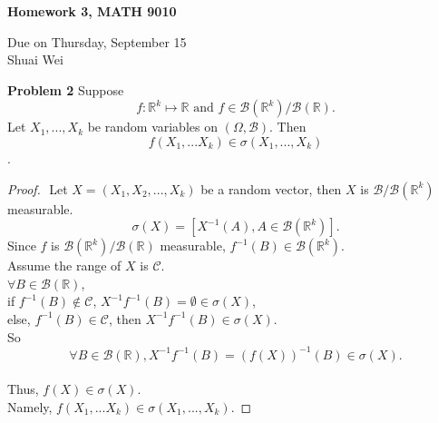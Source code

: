 \documentclass{article}
\newcommand{\llc}{\mathcal{C}}
\newcommand{\llb}{\mathcal{B}}
\newcommand{\bbr}{\mathbb{R}}
\begin{document}
\begin{center}

\textbf{Homework 3, MATH 9010}

Due on Thursday, September 15\\

Shuai Wei

\end{center}

\vspace{3 mm}

\noindent \textbf{Problem 2} Suppose\\
$$f : \bbr^k \mapsto \bbr \text{ and } f \in \llb (\bbr^k)/\llb(\bbr).$$
Let $X_1, ...,X_k $ be random variables on $(\Omega, \llb)$. Then\\

$$f(X_1,...X_k) \in \sigma(X_1,...,X_k)$$
.
\begin{proof}
	$ $ \newline
	Let $X = (X_1,X_2,...,X_k)$ be a random vector, then $X$ is $\llb/\llb(\bbr^k)$ measurable.\\
	$$\sigma(X) = [X^{-1}(A), A \in \llb(\bbr^k)].$$
	Since $f$ is $\llb(\bbr^k)/\llb(\bbr)$ measurable, $f^{-1}(B) \in \llb(\bbr^k)$.\\ 
	Assume the range of $X$ is $\llc$. \\
	$\forall B \in \llb(\bbr)$, \\
	if $f^{-1}(B) \not\in \llc$, $X^{-1}f^{-1}(B) = \emptyset \in \sigma(X)$, \\
	else, $f^{-1}(B) \in \llc$, then $X^{-1}f^{-1}(B) \in \sigma(X)$.\\
	So \\
	$$\forall B \in \llb(\bbr), X^{-1}f^{-1}(B)  = (f(X))^{-1}(B)\in \sigma(X).$$\\
	Thus, $f(X) \in \sigma(X)$.\\
	Namely, $f(X_1,...X_k) \in \sigma(X_1,...,X_k)$.
	
\end{proof}
\end{document}
